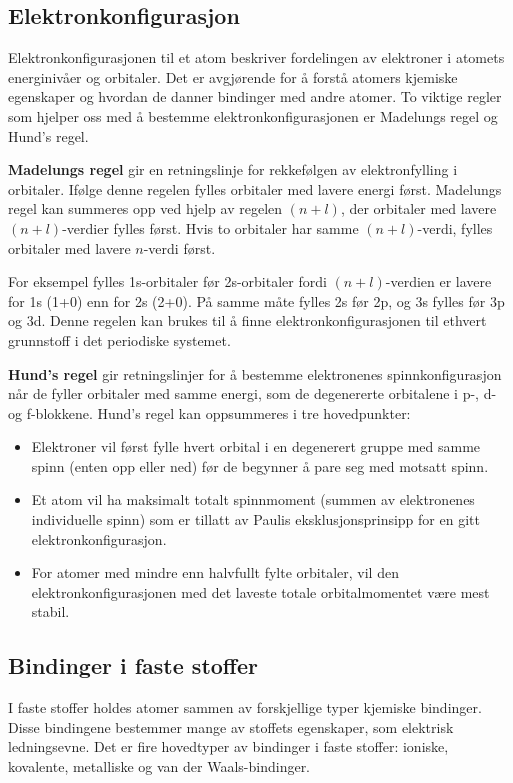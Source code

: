 \subsection*{Elektronkonfigurasjon}
Elektronkonfigurasjonen til et atom beskriver fordelingen av elektroner i atomets energinivåer og orbitaler. Det er avgjørende for å forstå atomers kjemiske egenskaper og hvordan de danner bindinger med andre atomer. To viktige regler som hjelper oss med å bestemme elektronkonfigurasjonen er Madelungs regel og Hund's regel.

\textbf{Madelungs regel} gir en retningslinje for rekkefølgen av elektronfylling i orbitaler. Ifølge denne regelen fylles orbitaler med lavere energi først. Madelungs regel kan summeres opp ved hjelp av regelen $(n+l)$, der orbitaler med lavere $(n+l)$-verdier fylles først. Hvis to orbitaler har samme $(n+l)$-verdi, fylles orbitaler med lavere $n$-verdi først.

For eksempel fylles 1s-orbitaler før 2s-orbitaler fordi $(n+l)$-verdien er lavere for 1s (1+0) enn for 2s (2+0). På samme måte fylles 2s før 2p, og 3s fylles før 3p og 3d. Denne regelen kan brukes til å finne elektronkonfigurasjonen til ethvert grunnstoff i det periodiske systemet.

\textbf{Hund's regel} gir retningslinjer for å bestemme elektronenes spinnkonfigurasjon når de fyller orbitaler med samme energi, som de degenererte orbitalene i p-, d- og f-blokkene. Hund's regel kan oppsummeres i tre hovedpunkter:
\begin{itemize}
    \item Elektroner vil først fylle hvert orbital i en degenerert gruppe med samme spinn (enten opp eller ned) før de begynner å pare seg med motsatt spinn.
    \item Et atom vil ha maksimalt totalt spinnmoment (summen av elektronenes individuelle spinn) som er tillatt av Paulis eksklusjonsprinsipp for en gitt elektronkonfigurasjon.
    \item For atomer med mindre enn halvfullt fylte orbitaler, vil den elektronkonfigurasjonen med det laveste totale orbitalmomentet være mest stabil.
\end{itemize}


\subsection*{Bindinger i faste stoffer}
I faste stoffer holdes atomer sammen av forskjellige typer kjemiske bindinger. Disse bindingene bestemmer mange av stoffets egenskaper, som elektrisk ledningsevne. Det er fire hovedtyper av bindinger i faste stoffer: ioniske, kovalente, metalliske og van der Waals-bindinger.

